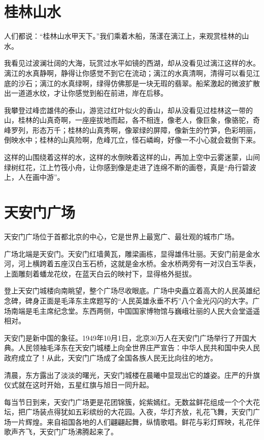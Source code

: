 \documentclass[12pt,UTF-8,openany]{ctexbook}
\begin{document}
\chapter{桂林山水}

\begin{Large}
    
    人们都说：“桂林山水甲天下。”我们乘着木船，荡漾在漓江上，来观赏桂林的山水。
    
    我看见过波澜壮阔的大海，玩赏过水平如镜的西湖，却从没看见过漓江这样的水。漓江的水真静啊，静得让你感觉不到它在流动；漓江的水真清啊，清得可以看见江底的沙石；漓江的水真绿啊，绿得仿佛那是一块无瑕的翡翠。船桨激起的微波扩散出一道道水纹，才让你感觉到船在前进，岸在后移。
    
    我攀登过峰峦雄伟的泰山，游览过红叶似火的香山，却从没看见过桂林这一带的山，桂林的山真奇啊，一座座拔地而起，各不相连，像老人，像巨象，像骆驼，奇峰罗列，形态万千；桂林的山真秀啊，像翠绿的屏障，像新生的竹笋，色彩明丽，倒映水中；桂林的山真险啊，危峰兀立，怪石嶙峋，好像一不小心就会栽倒下来。
    
    这样的山围绕着这样的水，这样的水倒映着这样的山，再加上空中云雾迷蒙，山间绿树红花，江上竹筏小舟，让你感到像是走进了连绵不断的画卷，真是“舟行碧波上，人在画中游”。
    
\end{Large}

\chapter{天安门广场}

\begin{Large}
    
    天安门广场位于首都北京的中心，它是世界上最宽广、最壮观的城市广场。
    
    广场北端是天安门。天安门红墙黄瓦，雕梁画栋，显得雄伟壮丽。天安门前是金水河，河上横跨着五座汉白玉石桥，这就是金水桥。金水桥两旁有一对汉白玉华表，上面雕刻着蟠龙花纹，在蓝天白云的映衬下，显得格外挺拔。
    
    登上天安门城楼向南眺望，整个广场尽收眼底。广场中央矗立着高大的人民英雄纪念碑，碑身正面是毛泽东主席题写的“人民英雄永垂不朽”八个金光闪闪的大字。广场南端是毛主席纪念堂。东西两侧，中国国家博物馆与巍峨壮丽的人民大会堂遥遥相对。
    
    天安门是新中国的象征。1949年10月1日，北京30万人在天安门广场举行了开国大典。人民领袖毛泽东在天安门城楼上向全世界庄严宣告：中华人民共和国中央人民政府成立了！从此，天安门广场成了全国各族人民无比向往的地方。
    
    清晨，东方露出了淡淡的曙光，天安门城楼在晨曦中显现出它的雄姿。庄严的升旗仪式就在这时开始，五星红旗与旭日一同升起。
    
    每当节日到来，天安门广场更是花团锦簇，姹紫嫣红。无数盆鲜花组成一个个大花坛，把广场装点得犹如五彩缤纷的大花园。入夜，华灯齐放，礼花飞舞，天安门广场一片辉煌。来自祖国各地的人们翩翩起舞，纵情歌唱。鲜花与彩灯辉映，礼花伴歌声齐飞，天安门广场沸腾起来了。
    
\end{Large}
\end{document}
